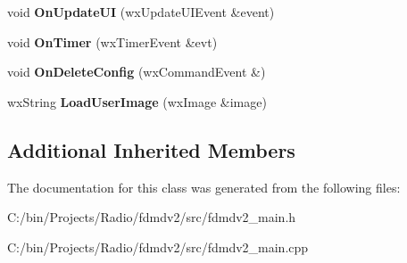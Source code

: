 \begin{DoxyCompactItemize}
\item 
\hypertarget{class_main_frame_a4757c5d7d0e9b2c98dc34336f1dce49e}{void {\bfseries On\-Update\-U\-I} (wx\-Update\-U\-I\-Event \&event)}\label{class_main_frame_a4757c5d7d0e9b2c98dc34336f1dce49e}

\item 
\hypertarget{class_main_frame_a9ad22e55c7a3c93f9c071d366ae760d6}{void {\bfseries On\-Timer} (wx\-Timer\-Event \&evt)}\label{class_main_frame_a9ad22e55c7a3c93f9c071d366ae760d6}

\item 
\hypertarget{class_main_frame_aad7f15728583b9b793b695dbaec482f3}{void {\bfseries On\-Delete\-Config} (wx\-Command\-Event \&)}\label{class_main_frame_aad7f15728583b9b793b695dbaec482f3}

\item 
\hypertarget{class_main_frame_a2577b78ec0105922e5356287519d2e54}{wx\-String {\bfseries Load\-User\-Image} (wx\-Image \&image)}\label{class_main_frame_a2577b78ec0105922e5356287519d2e54}

\end{DoxyCompactItemize}
\subsection*{Additional Inherited Members}


The documentation for this class was generated from the following files\-:\begin{DoxyCompactItemize}
\item 
C\-:/bin/\-Projects/\-Radio/fdmdv2/src/fdmdv2\-\_\-main.\-h\item 
C\-:/bin/\-Projects/\-Radio/fdmdv2/src/fdmdv2\-\_\-main.\-cpp\end{DoxyCompactItemize}
